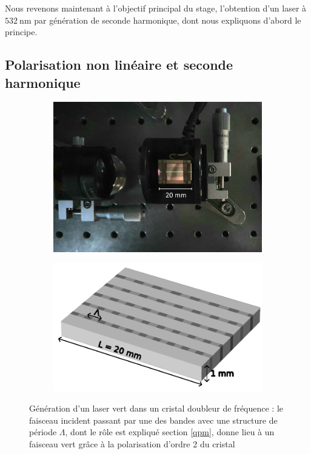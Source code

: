 \documentclass[11pt,a4paper]{article}
\newcommand{\lmbd}[1]{$\SI{#1}{\nano\metre}$}
\begin{document}
Nous revenons maintenant à l'objectif principal du stage, l'obtention d'un laser à \lmbd{532} par génération de seconde harmonique, dont nous expliquons d'abord le principe.

\subsection{Polarisation non linéaire et seconde harmonique} 

\begin{figure}[h]
\centering
\begin{subfigure}{0.45\textwidth}
	\includegraphics[width=\textwidth]{./img/cristal clair.jpg}
\end{subfigure}
\begin{subfigure}{0.5\textwidth}
	\includegraphics[width=\textwidth]{./img/cristal.pdf}
\end{subfigure}
\caption{Génération d'un laser vert dans un cristal doubleur de fréquence : \small le faisceau incident passant par une des bandes avec une structure de période $\Lambda$, dont le rôle est expliqué section \ref{qpm}, donne lieu à un faisceau vert grâce à la polarisation d'ordre 2 du cristal}
\label{fig:cristal}
\end{figure}
\end{document}
